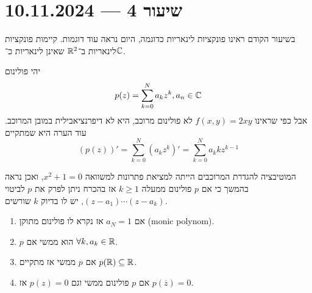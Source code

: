 \section{שיעור 4 --- 10.11.2024}
בשיעור הקודם ראינו פונקציות לינאריות כדוגמה, היום נראה עוד דוגמות.
קיימות פונקציות לינאריות ב־$\mathbb{R}^2$ שאינן לינאריות כ־$\mathbb{C}$.
\begin{example}
	יהי פולינום
	\[
		p(z) = \sum_{k = 0}^{N} a_k z^k, a_n \in \mathbb{C}
	\]
	אבל כפי שראינו $f(x, y) = 2x y$ לא פולינום מרוכב, היא לא דיפרנציאבילית במובן המרוכב.
	עוד הערה היא שמתקיים
	\[
		(p(z))' = \sum_{k = 0}^{N} (a_k z^k)' = \sum_{k = 0}^{N} a_k k z^{k - 1}
	\]
\end{example}
המוטיבציה להגדרת המרוכבים הייתה למציאת פתרונות למשוואה $x^2 + 1 = 0$, ואכן נראה בהמשך כי אם $p$ פולינום ממעלה $k \ge 1$ אז בהכרח ניתן לפרק את $p$ לביטוי $(z - a_1) \cdots (z - a_k)$, יש לו בדיוק $k$ שורשים.
\begin{proposition}
	\begin{enumerate}
		\item אם $a_N = 1$ אז נקרא לו פולינום מתוקן (monic polynom).
		\item $p$ הוא ממשי אם $\forall k, a_k \in \mathbb{R}$.
		\item אם $p$ ממשי אז מתקיים $p(\mathbb{R}) \subseteq \mathbb{R}$.
		\item אם $p$ פולינום ממשי וגם $p(z) = 0$ אז $p(\overline{z}) = 0$.
	\end{enumerate}
\end{proposition}

